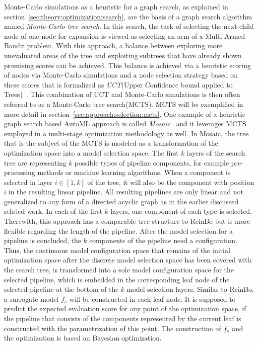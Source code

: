 Monte-Carlo simulations as a heuristic for a graph search, as explained in section~\ref{sec:theory:optimization:search}, are the basis of a graph search algorithm named \textit{Monte-Carlo tree search}.
In this search, the task of selecting the next child node of one node for expansion is viewed as selecting an arm of a Multi-Armed Bandit problem.
With this approach, a balance between exploring more unevaluated areas of the tree and exploiting subtrees that have already shown promising scores can be achieved.
This balance is achieved via a heuristic scoring of nodes via Monte-Carlo simulations and a node selection strategy based on these scores that is formalized as \textit{UCT}(Upper Confidence bound applied to Trees)~\cite{Kocsis-UCT}.
This combination of UCT and Monte-Carlo simulations is then often referred to as a Monte-Carlo tree search(MCTS).
MCTS will be exemplified in more detail in section~\ref{sec:approach:selection:mcts}.\newline
One example of a heuristic graph search based AutoML approach is called \textit{Mosaic}~\cite{Rakotoarison-Mosaic} and it leverages MCTS employed in a multi-stage optimization methodology as well.
In Mosaic, the tree that is the subject of the MCTS is modeled as a transformation of the optimization space into a model selection space.
The first $k$ layers of the search tree are representing $k$ possible types of pipeline components, for example pre-processing methods or machine learning algorithms.
When a component is selected in layer $i \in [1,k]$ of the tree, it will also be the component with position $i$ in the resulting linear pipeline.
All resulting pipelines are only linear and not generalized to any form of a directed acyclic graph as in the earlier discussed related work.
In each of the first $k$ layers, one component of each type is selected.
Therewith, this approach has a comparable tree structure to ReinBo but is more flexible regarding the length of the pipeline.\newline
After the model selection for a pipeline is concluded, the $k$ components of the pipeline need a configuration.
Thus, the continuous model configuration space that remains of the initial optimization space after the discrete model selection space has been covered with the search tree, is transformed into a sole model configuration space for the selected pipeline, which is embedded in the corresponding leaf node of the selected pipeline at the bottom of the $k$ model selection layers.
Similar to ReinBo, a surrogate model $f_s$ will be constructed in each leaf node.
It is supposed to predict the expected evaluation score for any point of the optimization space, if the pipeline that consists of the components represented by the current leaf is constructed with the parametrization of this point.
The construction of $f_s$ and the optimization is based on Bayesian optimization.


